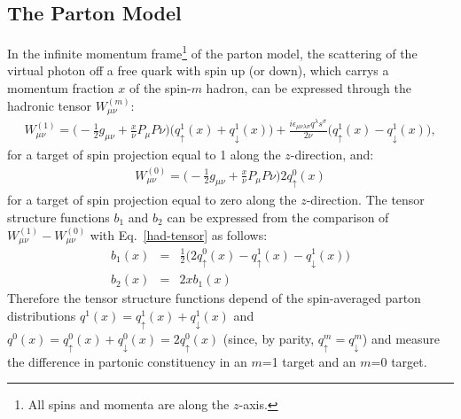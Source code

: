 \subsection{The Parton Model}
%
In the infinite momentum frame\footnote{All spins and
momenta are along the $z$-axis.} of the parton model, 
the scattering of the virtual photon off a free quark 
with spin up (or down), which carrys a momentum fraction $x$ of the spin-$m$ hadron, can be 
expressed through the hadronic tensor $W_{\mu\nu}^{(m)}$:
%
\begin{eqnarray}
W_{\mu\nu}^{(1)} = \Bigg(- \frac{1}{2} g_{\mu\nu} + \frac{x}{\nu} P_{\mu}P{\nu}\Bigg) 
                               \Big(q^1_{\uparrow}(x) + q^1_{\downarrow}(x)\Big) \nonumber
                    + \frac{i \epsilon_{\mu\nu\lambda\sigma} q^{\lambda} s^{\sigma}}{2 \nu} 
                               \Big(q^1_{\uparrow}(x) - q^1_{\downarrow}(x)\Big),
\label{had-tensor-1}
\end{eqnarray}
%
for a target of spin projection equal to 1 along the $z$-direction, and:
%
\begin{eqnarray}
W_{\mu\nu}^{(0)} = \Bigg(- \frac{1}{2} g_{\mu\nu} + \frac{x}{\nu} P_{\mu}P{\nu}\Bigg) 
                               2 q^0_{\uparrow}(x) 
\label{had-tensor-0}
\end{eqnarray}
%
for a target of spin projection equal to zero along the $z$-direction. The tensor 
structure functions $b_1$ and $b_2$ can be expressed from the comparison of 
$W_{\mu\nu}^{(1)} - W_{\mu\nu}^{(0)}$ with Eq.~\ref{had-tensor} as follows:
%
\begin{eqnarray}
b_1(x) &=& \frac{1}{2} \Big( 2 q^0_{\uparrow}(x) - q^1_{\uparrow}(x) - q^1_{\downarrow}(x) \Big) \nonumber \\
b_2(x) &=& 2 x b_1(x)
\label{TSF-parton}
\end{eqnarray}
%
Therefore the tensor structure functions depend of the spin-averaged parton distributions 
$q^1(x) = q^1_{\uparrow}(x) + q^1_{\downarrow}(x)$ and $q^0(x) = q^0_{\uparrow}(x) + q^0_{\downarrow}(x) 
= 2 q^0_{\uparrow}(x)$ (since, by parity, $q^m_{\uparrow}= q^m_{\downarrow}$) and measure the difference
in partonic constituency in an $m$=1 target and an $m$=0 target. 


%
%





